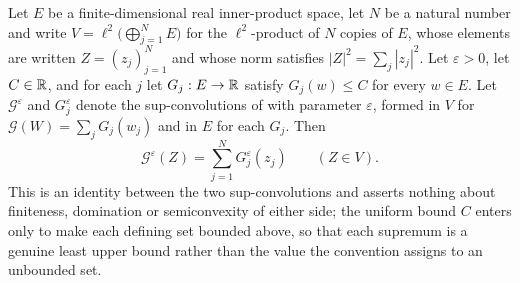 \begin{lemma}
Let $E$ be a finite-dimensional real inner-product space, let $N$ be a natural
number and write $V=\ell^2\bigl(\bigoplus_{j=1}^NE\bigr)$ for the
$\ell^2$-product of $N$ copies of $E$, whose elements are written
$Z=(z_j)_{j=1}^N$ and whose norm satisfies $|Z|^2=\sum_j|z_j|^2$. Let
$\varepsilon>0$, let $C\in\mathbb{R}$, and for each $j$ let $G_j:E\to\mathbb{R}$ satisfy
$G_j(w)\le C$ for every $w\in E$. Let $\mathcal G^\varepsilon$ and
$G_j^\varepsilon$ denote the sup-convolutions of  with
parameter $\varepsilon$, formed in $V$ for $\mathcal G(W)=\sum_jG_j(w_j)$ and in
$E$ for each $G_j$. Then
\[
  \mathcal G^\varepsilon(Z)=\sum_{j=1}^NG_j^\varepsilon(z_j)
  \qquad(Z\in V).
\]
This is an identity between the two sup-convolutions and asserts nothing about
finiteness, domination or semiconvexity of either side; the uniform bound $C$
enters only to make each defining set bounded above, so that each supremum is a
genuine least upper bound rather than the value the convention assigns to an
unbounded set.
\end{lemma}
